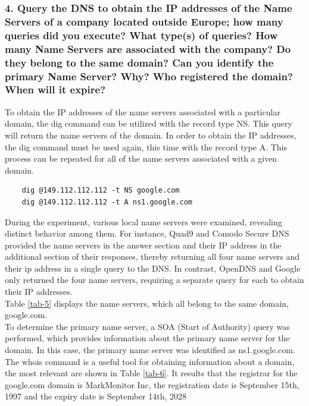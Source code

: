 \documentclass[eng]{class}
\begin{document}
\subsubsection*{4. Query the DNS to obtain the IP addresses of the Name Servers of a company
  located outside Europe; how many queries did you execute? What type(s) of
  queries? How many Name Servers are associated with the company? Do they
  belong to the same domain? Can you identify the primary Name Server? Why?
  Who registered the domain? When will it expire?}
To obtain the IP addresses of the name servers associated with a particular domain, the dig command can be utilized with the record type NS.
This query will return the name servers of the domain.
In order to obtain the IP addresses, the dig command must be used again, this time with the record type A.
This process can be repeated for all of the name servers associated with a given domain.
\begin{lstlisting}
    dig @149.112.112.112 -t NS google.com
    dig @149.112.112.112 -t A ns1.google.com
\end{lstlisting}
During the experiment, various local name servers were examined, revealing distinct behavior among them.
For instance, Quad9 and Comodo Secure DNS provided the name servers in the answer section and their IP address in the additional section of their responses,
thereby returning all four name servers and their ip address in a single query to the DNS.
In contrast, OpenDNS and Google only returned the four name servers, requiring a separate query for each to obtain their IP addresses.\\
Table \ref*{tab-5} displays the name servers, which all belong to the same domain, google.com.\\
To determine the primary name server, a SOA (Start of Authority) query was performed,
which provides information about the primary name server for the domain.
In this case, the primary name server was identified as ns1.google.com.\\
\noindent
The whois command is a useful tool for obtaining information about a domain, the most relevant are shown in Table \ref{tab-6}.
It results that the registrar for the  google.com domain is MarkMonitor Inc, the registration date is September 15th, 1997 and the expiry date is September 14th, 2028
\end{document}

